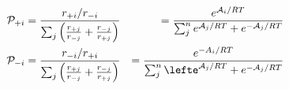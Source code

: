 \begin{eqnarray}\
{\mathcal P}_{+i}  & =  \frac{r_{+i}/r_{-i}}{\sum_j\left(\frac{r_{+j}}{r_{-j}} + \frac{r_{-j}}{r_{+j}}  \right)} & =  \frac{e^{\mathcal A_i/RT}}{\sum_j^n e^{\mathcal A_j/RT} + e^{-\mathcal A_j/RT}} \\
{\mathcal P}_{-i}  & =  \frac{r_{-i}/r_{+i}}{\sum_j\left(\frac{r_{+j}}{r_{-j}} + \frac{r_{-j}}{r_{+j}}  \right)} & =  \frac{e^{\mathcal -A_i/RT}}{\sum_j^n \lefte^{\mathcal A_j/RT} + e^{-\mathcal A_j/RT}} \\
\end{eqnarray}
